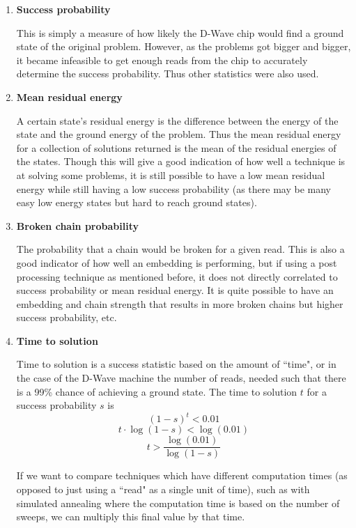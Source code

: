 \documentclass[11pt]{report}
\newcommand{\?}{\stackrel{?}{=}}
\begin{document}
\begin{enumerate}
\item\textbf{Success probability}

This is simply a measure of how likely the D-Wave chip would find a ground state of the original problem. However, as the problems got bigger and bigger, it became infeasible to get enough reads from the chip to accurately determine the success probability. Thus other statistics were also used.

\item\textbf{Mean residual energy}

A certain state's residual energy is the difference between the energy of the state and the ground energy of the problem. Thus the mean residual energy for a collection of solutions returned is the mean of the residual energies of the states. Though this will give a good indication of how well a technique is at solving some problems, it is still possible to have a low mean residual energy while still having a low success probability (as there may be many easy low energy states but hard to reach ground states).

\item\textbf{Broken chain probability}

The probability that a chain would be broken for a given read. This is also a good indicator of how well an embedding is performing, but if using a post processing technique as mentioned before, it does not directly correlated to success probability or mean residual energy. It is quite possible to have an embedding and chain strength that results in more broken chains but higher success probability, etc.

\item\textbf{Time to solution}

Time to solution is a success statistic based on the amount of ``time", or in the case of the D-Wave machine the number of reads, needed such that there is a 99\% chance of achieving a ground state. The time to solution $t$ for a success probability $s$ is
$$(1-s)^t < 0.01$$
$$t\cdot \log(1-s) < \log(0.01)$$
$$t > \frac{\log(0.01)}{\log(1-s)}$$

If we want to compare techniques which have different computation times (as opposed to just using a ``read" as a single unit of time), such as with simulated annealing where the computation time is based on the number of sweeps, we can multiply this final value by that time. 
\end{enumerate}
\end{document}

